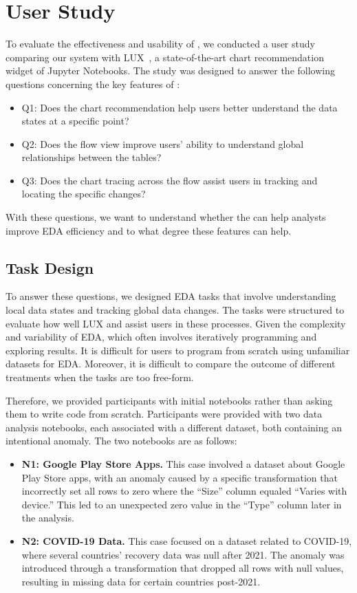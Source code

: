 
\section{User Study}
To evaluate the effectiveness and usability of \system{}, we conducted a user study comparing our system with LUX~\cite{lee2021lux}, a state-of-the-art chart recommendation widget of Jupyter Notebooks. The study was designed to answer the following questions concerning the key features of \system{}:
\begin{itemize}
    \item Q1: Does the chart recommendation help users better understand the data states at a specific point?
    \item Q2: Does the flow view improve users' ability to understand global relationships between the tables? 
    \item Q3: Does the chart tracing across the flow assist users in tracking and locating the specific changes?
\end{itemize}
With these questions, we want to understand whether the \system{} can help analysts improve EDA efficiency and to what degree these features can help.

\subsection{Task Design}

To answer these questions, we designed EDA tasks that involve understanding local data states and tracking global data changes. 
The tasks were structured to evaluate how well LUX and \system{} assist users in these processes. 
Given the complexity and variability of EDA, which often involves iteratively programming and exploring results. It is difficult for users to program from scratch using unfamiliar datasets for EDA. 
Moreover, it is difficult to compare the outcome of different treatments when the tasks are too free-form.

Therefore, we provided participants with initial notebooks rather than asking them to write code from scratch. 
Participants were provided with two data analysis notebooks, each associated with a different dataset, both containing an intentional anomaly. 
The two notebooks are as follows: 

\begin{itemize}

    \item \textbf{N1: Google Play Store Apps.} 
    This case involved a dataset about Google Play Store apps, with an anomaly caused by a specific transformation that incorrectly set all rows to zero where the ``Size'' column equaled ``Varies with device.'' This led to an unexpected zero value in the ``Type'' column later in the analysis.

    \item \textbf{N2: COVID-19 Data.} This case focused on a dataset related to COVID-19, where several countries' recovery data was null after 2021. The anomaly was introduced through a transformation that dropped all rows with null values, resulting in missing data for certain countries post-2021.
\end{itemize}

